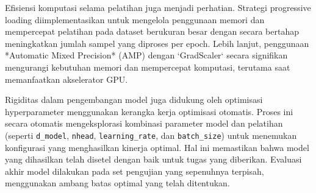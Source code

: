 Efisiensi komputasi selama pelatihan juga menjadi perhatian. Strategi progressive loading diimplementasikan untuk mengelola penggunaan memori dan mempercepat pelatihan pada dataset berukuran besar dengan secara bertahap meningkatkan jumlah sampel yang diproses per epoch. Lebih lanjut, penggunaan *Automatic Mixed Precision* (AMP) dengan `GradScaler` secara signifikan mengurangi kebutuhan memori dan mempercepat komputasi, terutama saat memanfaatkan akselerator GPU.

Rigiditas dalam pengembangan model juga didukung oleh optimisasi hyperparameter menggunakan kerangka kerja optimisasi otomatis. 
Proses ini secara otomatis mengeksplorasi kombinasi parameter model dan pelatihan (seperti \texttt{d\_model}, \texttt{nhead}, \texttt{learning\_rate}, dan \texttt{batch\_size}) untuk menemukan konfigurasi yang menghasilkan kinerja optimal. 
Hal ini memastikan bahwa model yang dihasilkan telah disetel dengan baik untuk tugas yang diberikan. 
Evaluasi akhir model dilakukan pada set pengujian yang sepenuhnya terpisah, menggunakan ambang batas optimal yang telah ditentukan.
